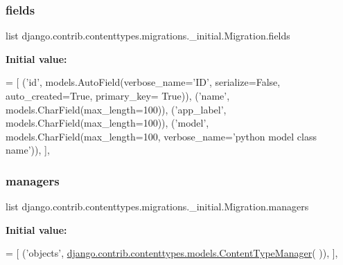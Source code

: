 \subsubsection{\texorpdfstring{fields}{fields}}
{\footnotesize\ttfamily list django.\+contrib.\+contenttypes.\+migrations.\+\_\+initial.\+Migration.\+fields\hspace{0.3cm}{\ttfamily [static]}}

{\bfseries Initial value\+:}
\begin{DoxyCode}
= [
                (\textcolor{stringliteral}{'id'}, models.AutoField(verbose\_name=\textcolor{stringliteral}{'ID'}, serialize=\textcolor{keyword}{False}, auto\_created=\textcolor{keyword}{True}, primary\_key=\textcolor{keyword}{
      True})),
                (\textcolor{stringliteral}{'name'}, models.CharField(max\_length=100)),
                (\textcolor{stringliteral}{'app\_label'}, models.CharField(max\_length=100)),
                (\textcolor{stringliteral}{'model'}, models.CharField(max\_length=100, verbose\_name=\textcolor{stringliteral}{'python model class name'})),
            ],
\end{DoxyCode}
\mbox{\label{classdjango_1_1contrib_1_1contenttypes_1_1migrations_1_10001__initial_1_1_migration_aec1b5d8be14526866b78dcb19c453e3d}} 
\subsubsection{\texorpdfstring{managers}{managers}}
{\footnotesize\ttfamily list django.\+contrib.\+contenttypes.\+migrations.\+\_\+initial.\+Migration.\+managers\hspace{0.3cm}{\ttfamily [static]}}

{\bfseries Initial value\+:}
\begin{DoxyCode}
= [
                (\textcolor{stringliteral}{'objects'}, 
      \mbox{\hyperlink{classdjango_1_1contrib_1_1contenttypes_1_1models_1_1_content_type_manager}{django.contrib.contenttypes.models.ContentTypeManager}}(
      )),
            ],
\end{DoxyCode}
\mbox{\label{classdjango_1_1contrib_1_1contenttypes_1_1migrations_1_10001__initial_1_1_migration_a63500a5d0b9d0a3605c3de47af56e851}} 
